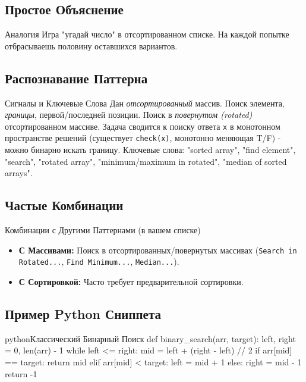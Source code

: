 \subsection{Простое Объяснение}
\begin{myblock}{Аналогия}
    Игра "угадай число" в отсортированном списке. На каждой попытке отбрасываешь половину оставшихся вариантов.
\end{myblock}

\subsection{Распознавание Паттерна}
\begin{myblock}{Сигналы и Ключевые Слова}
    Дан \emph{отсортированный} массив. Поиск элемента, \emph{границы}, первой/последней позиции. Поиск в \emph{повернутом (rotated)} отсортированном массиве. Задача сводится к поиску ответа \texttt{x} в монотонном пространстве решений (существует \texttt{check(x)}, монотонно меняющая T/F) - можно бинарно искать границу. \newline
    Ключевые слова: "sorted array", "find element", "search", "rotated array", "minimum/maximum in rotated", "median of sorted arrays".
\end{myblock}

\subsection{Частые Комбинации}
\begin{myblock}{Комбинации с Другими Паттернами (в вашем списке)}
    \begin{itemize}[nosep, leftmargin=*]
        \item \textbf{С Массивами:} Поиск в отсортированных/повернутых массивах (\texttt{Search in Rotated...}, \texttt{Find Minimum...}, \texttt{Median...}).
        \item \textbf{С Сортировкой:} Часто требует предварительной сортировки.
    \end{itemize}
\end{myblock}

\subsection{Пример Python Сниппета}
\begin{codebox}{python}{Классический Бинарный Поиск}
def binary_search(arr, target):
    left, right = 0, len(arr) - 1
    while left <= right:
        mid = left + (right - left) // 2
        if arr[mid] == target:
            return mid
        elif arr[mid] < target:
            left = mid + 1
        else:
            right = mid - 1
    return -1
\end{codebox}

